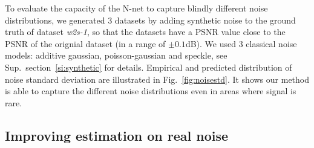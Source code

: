 \documentclass{article}
\begin{document}
To evaluate the capacity of the N-net to capture blindly different noise distributions, we generated 3 datasets by adding synthetic noise to the ground truth of dataset \textit{w2s-1}, so that the datasets have a PSNR value close to the PSNR of the orignial dataset (in a range of $\pm0.1$dB).
We used 3 classical noise models: additive gaussian, poisson-gaussian and speckle, see Sup.~section~\ref{si:synthetic} for details.
Empirical and predicted distribution of noise standard deviation are illustrated in Fig.~\ref{fig:noisestd}.
It shows our method is able to capture the different noise distributions even in areas where signal is rare.

\subsection{Improving estimation on real noise}
\end{document}
